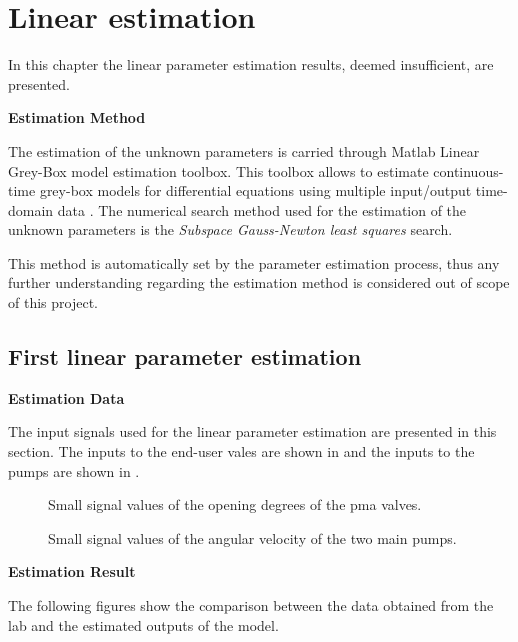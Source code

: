 \chapter{Linear estimation}
\label{LinResults_failed_attempts}
In this chapter the linear parameter estimation results, deemed insufficient, are presented.   

\textbf{Estimation Method}

The estimation of the unknown parameters is carried through Matlab Linear Grey-Box model estimation toolbox. This toolbox allows to estimate continuous-time 
grey-box models for differential equations using multiple input/output time-domain data \cite{LinearEstimation}.
The numerical search method used for the estimation of the unknown parameters is the \textit{Subspace Gauss-Newton least squares} search. 

This method is automatically set by the parameter estimation process, thus any further understanding regarding the estimation method is considered out of 
scope of this project. 

\section{First linear parameter estimation}
\label{LinResults_worst}
\textbf{Estimation Data}

The input signals used for the linear parameter estimation are presented in this section.  
The inputs to the end-user vales are shown in  and the inputs to the pumps are shown in . 


\begin{figure}[H]
  \centering
  \begin{minipage}[b]{0.45\textwidth}
     
    \caption{Small signal values of the opening degrees of the pma valves. }
    \label{fig:est_OD_data_w}
  \end{minipage}
  \hfill
  \begin{minipage}[b]{0.45\textwidth}
     
    \caption{Small signal values of the angular velocity of the two main pumps.}
    \label{fig:est_deltap_data_w}
  \end{minipage}
\end{figure}


\textbf{Estimation Result}

The following figures show the comparison between the data obtained from the lab and the estimated outputs of the model.  

